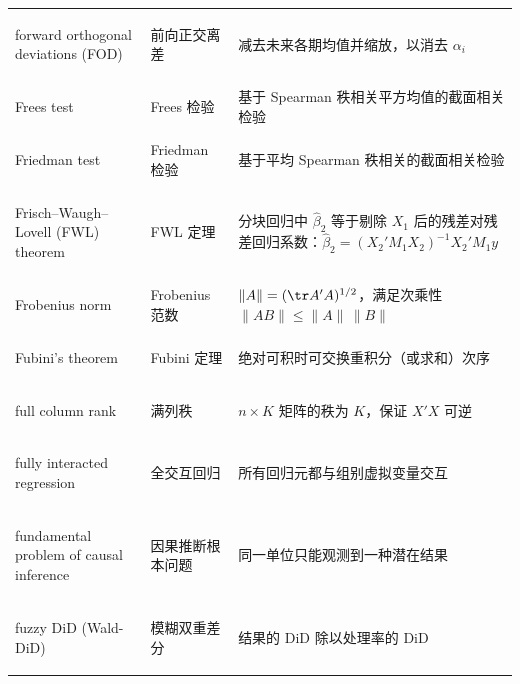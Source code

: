\begin{longtable}{@{}>{\bfseries\boldmath\raggedright\arraybackslash}p{4.6cm}>{\raggedright\arraybackslash}p{3.2cm}>{\raggedright\arraybackslash}p{\dimexpr\textwidth-7.8cm-4\tabcolsep\relax}@{}}
forward orthogonal deviations (FOD) & 前向正交离差 & 减去未来各期均值并缩放，以消去 $\alpha_i$ \\
Frees test & Frees 检验 & 基于 Spearman 秩相关平方均值的截面相关检验 \\
Friedman test & Friedman 检验 & 基于平均 Spearman 秩相关的截面相关检验 \\
Frisch--Waugh--Lovell (FWL) theorem & FWL 定理 & 分块回归中 $\hat\beta_2$ 等于剔除 $X_1$ 后的残差对残差回归系数：$\hat\beta_2=(X_2'M_1X_2)^{-1}X_2'M_1y$ \\
Frobenius norm & Frobenius 范数 & $\|A\|=(\tr A'A)^{1/2}$，满足次乘性 $\|AB\|\le\|A\|\,\|B\|$ \\
Fubini's theorem & Fubini 定理 & 绝对可积时可交换重积分（或求和）次序 \\
full column rank & 满列秩 & $n\times K$ 矩阵的秩为 $K$，保证 $X'X$ 可逆 \\
fully interacted regression & 全交互回归 & 所有回归元都与组别虚拟变量交互 \\
fundamental problem of causal inference & 因果推断根本问题 & 同一单位只能观测到一种潜在结果 \\
fuzzy DiD (Wald-DiD) & 模糊双重差分 & 结果的 DiD 除以处理率的 DiD \\
\end{longtable}

\par{}\ifdim\dimexpr\pagegoal-\pagetotal\relax<16\baselineskip\newpage\fi
